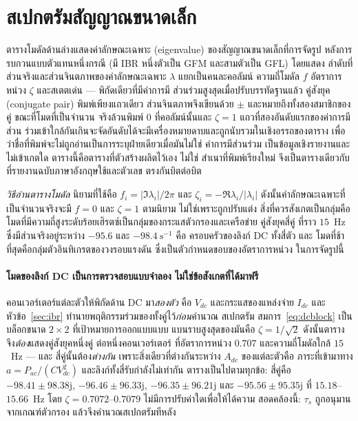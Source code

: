 \documentclass[12pt,a4paper]{article}
\begin{document}
\section{สเปกตรัมสัญญาณขนาดเล็ก}\label{sec:sssa}
ตารางโมดัลด้านล่างแสดงค่าลักษณะเฉพาะ (eigenvalue) ของสัญญาณขนาดเล็กที่การจัดรูป
หลังการรบกวนแบบตัวแทนหนึ่งกรณี (มี IBR หนึ่งตัวเป็น GFM และสามตัวเป็น GFL) โดยแสดง
ลำดับที่ ส่วนจริงและส่วนจินตภาพของค่าลักษณะเฉพาะ $\lambda$ แยกเป็นคนละคอลัมน์
ความถี่โมดัล $f$ อัตราการหน่วง $\zeta$ และสเตตเด่น --- พิกัดเดียวที่มีค่าการมี
ส่วนร่วมสูงสุดเมื่อปรับบรรทัดฐานแล้ว คู่สังยุค (conjugate pair) พิมพ์เพียงแถวเดียว
ส่วนจินตภาพจึงเขียนด้วย $\pm$ และหมายถึงทั้งสองสมาชิกของคู่ ขณะที่โมดที่เป็นจำนวน
จริงล้วนพิมพ์ $0$ ที่คอลัมน์นั้นและ $\zeta=1$ แถวที่สองอันดับแรกของค่าการมีส่วน
ร่วมเข้าใกล้กันเกินจะจัดอันดับได้จะมีเครื่องหมายดาบและถูกนับรวมในเชิงอรรถของตาราง
เพื่อว่าชื่อที่พิมพ์จะไม่ถูกอ่านเป็นการระบุฝ่ายเดียวเมื่อมันไม่ใช่ ค่าการมีส่วนร่วม
เป็นข้อมูลเชิงรายงานและไม่เข้าเกตใด ตารางนี้คือตารางที่ตัวสร้างผลิตไว้เอง ไม่ใช่
สำเนาที่พิมพ์เรียงใหม่ จึงเป็นตารางเดียวกับที่รายงานฉบับภาษาอังกฤษใช้และตัวเลข
ตรงกันบิตต่อบิต

\emph{วิธีอ่านตารางโมดัล} นิยามที่ใช้คือ $f_i=|\Im\lambda_i|/2\pi$ และ
$\zeta_i=-\Re\lambda_i/|\lambda_i|$ ดังนั้นค่าลักษณะเฉพาะที่เป็นจำนวนจริงจะมี
$f=0$ และ $\zeta=1$ ตามนิยาม ไม่ใช่เพราะถูกปรับแต่ง สิ่งที่ควรสังเกตเป็นกลุ่มคือ
โมดที่มีความถี่สูงระดับร้อยเฮิรตซ์เป็นกลุ่มของกระแสตัวกรองและเครือข่าย คู่สังยุคสี่คู่
ที่ราว $15$~Hz ซึ่งมีส่วนจริงอยู่ระหว่าง $-95.6$ และ $-98.4~\mathrm{s}^{-1}$ คือ
ครอบครัวของลิงก์ DC ทั้งสี่ตัว และ
โมดที่ช้าที่สุดคือกลุ่มตัวอินทิเกรตของวงรอบแรงดัน ซึ่งเป็นตัวกำหนดขอบของอัตราการหน่วง
ในการจัดรูปนี้

\paragraph{โมดของลิงก์ DC เป็นการตรวจสอบแบบจำลอง ไม่ใช่ข้อสังเกตที่ได้มาฟรี}
คอนเวอร์เตอร์แต่ละตัวให้พิกัดด้าน DC มา\emph{สองตัว} คือ $V_{dc}$ และกระแสของแหล่งจ่าย
$I_{dc}$ และหัวข้อ~\ref{sec:ibr} ทำนายพฤติกรรมร่วมของทั้งคู่ไว้\emph{ก่อน}คำนวณ
สเปกตรัม สมการ~\eqref{eq:dcblock} เป็นบล็อกขนาด $2\times2$ ที่เป้าหมายการออกแบบแบบ
แบนราบสูงสุดของมันคือ $\zeta=1/\sqrt2$ ดังนั้นตารางจึง\emph{ต้อง}แสดงคู่สังยุคหนึ่งคู่
ต่อหนึ่งคอนเวอร์เตอร์ ที่อัตราการหน่วง $0.707$ และความถี่โมดัลใกล้ $15$~Hz --- และ
สี่คู่นั้นต้อง\emph{ต่างกัน} เพราะสิ่งเดียวที่ต่างกันระหว่าง $A_{dc}$ ของแต่ละตัวคือ
ภาระที่เข้ามาทาง $a=P_{ac}/(C V_{dc}^{2})$ และลิงก์ทั้งสี่รับกำลังไม่เท่ากัน
ตารางเป็นไปตามทุกข้อ: สี่คู่คือ
$-98.41\pm98.38\mathrm{j}$, $-96.46\pm96.33\mathrm{j}$,
$-96.35\pm96.21\mathrm{j}$ และ $-95.56\pm95.35\mathrm{j}$ ที่
$15.18$--$15.66$~Hz โดย $\zeta=0.7072$--$0.7079$ ไม่มีการปรับค่าใดเพื่อให้ได้ความ
สอดคล้องนี้: $\tau_s$ ถูกอนุมานจากเกณฑ์ตัวกรอง แล้วจึงคำนวณสเปกตรัมทีหลัง
\end{document}
